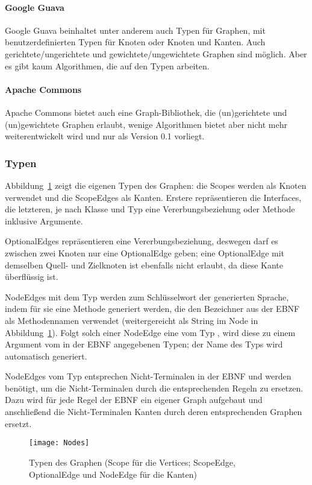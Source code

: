 \documentclass[../InterneDSLs.tex]{subfiles}
\begin{document}
\paragraph{Google Guava}
Google Guava beinhaltet unter anderem auch Typen für Graphen, mit benutzerdefinierten Typen für Knoten oder Knoten und Kanten. Auch gerichtete/ungerichtete und gewichtete/ungewichtete Graphen sind möglich. Aber es gibt kaum Algorithmen, die auf den Typen arbeiten.

\paragraph{Apache Commons}
Apache Commons bietet auch eine Graph-Bibliothek, die (un)gerichtete und (un)gewichtete Graphen erlaubt, wenige Algorithmen bietet aber nicht mehr weiterentwickelt wird und nur als Version 0.1 vorliegt.

\subsubsection{Typen}
Abbildung~\ref{FIG:GraphTypes} zeigt die eigenen Typen des Graphen: die Scopes werden als Knoten verwendet und die ScopeEdges als Kanten. Erstere repräsentieren die Interfaces, die letzteren, je nach Klasse und Typ eine Vererbungsbeziehung oder Methode inklusive Argumente.

OptionalEdges repräsentieren eine Vererbungsbeziehung, deswegen darf es zwischen zwei Knoten nur eine OptionalEdge geben; eine OptionalEdge mit demselben Quell- und Zielknoten ist ebenfalls nicht erlaubt, da diese Kante überflüssig ist.

NodeEdges mit dem Typ  werden zum Schlüsselwort der generierten Sprache, indem für sie eine Methode generiert werden, die den Bezeichner aus der EBNF als Methodennamen verwendet (weitergereicht als String im Node in Abbildung~\ref{FIG:GraphTypes}). Folgt solch einer NodeEdge eine vom Typ , wird diese zu einem Argument vom in der EBNF angegebenen Typen; der Name des Typs wird automatisch generiert.

NodeEdges vom Typ  entsprechen Nicht-Terminalen in der EBNF und werden benötigt, um die Nicht-Terminalen durch die entsprechenden Regeln zu ersetzen. Dazu wird für jede Regel der EBNF ein eigener Graph aufgebaut und anschließend die Nicht-Terminalen Kanten durch deren entsprechenden Graphen ersetzt.
\begin{figure}[ht]
\centering
\texttt{[image: Nodes]}
\caption{Typen des Graphen (Scope für die Vertices; ScopeEdge, OptionalEdge und NodeEdge für die Kanten)}
\label{FIG:GraphTypes}
\end{figure}
\end{document}
